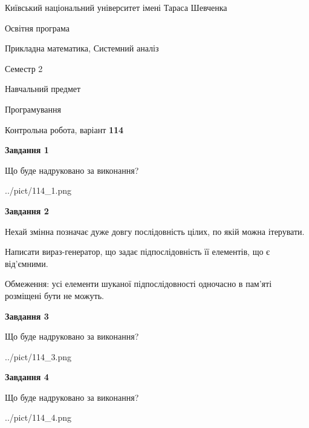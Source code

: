 \documentclass[12pt, ukrainian]{article}
\begin{document}
{{\begin {small}\par
{ \center  Київський національний університет імені Тараса Шевченка \par}
{\parbox {5 cm}{Освітня програма \hfill}{\parbox {8 cm}{Прикладна математика, Системний аналіз \hfill}}\parbox {5 cm}{\hfill Семестр 2}}\par
{\parbox {5 cm} {Навчальний предмет \hfill}\parbox {7 cm}{Програмування \hfill}\parbox {6cm}{\hfill}\par}\vspace{-7pt} \end{small}}{\center Контрольна робота, варіант  \No \textbf
{ 114 }\par}}
{
\begin {large}
{\begin {center}\textbf{Завдання 1}\end {center}}\par
Що буде надруковано за виконання?\par\par
\begin{center}
	{../pict/114_1.png}
\end{center}
\newpage

{\begin {center}\textbf{Завдання 2}\end {center}}\par
Нехай змінна  позначає дуже довгу послідовність цілих, по якій можна ітерувати.

Написати вираз-генератор, що задає підпослідовність її елементів, що є від'єм\-ни\-ми.

Обмеження: усі елементи шуканої підпослідовності одночасно в пам'яті розміщені бути не можуть.\par
\newpage

{\begin {center}\textbf{Завдання 3}\end {center}}\par
Що буде надруковано за виконання?
\begin{center}
	{../pict/114_3.png}
\end{center}
\newpage

{\begin {center}\textbf{Завдання 4}\end {center}}\par
Що буде надруковано за виконання?\par
\begin{center}
	{../pict/114_4.png}
\end{center}
\newpage


\end{large}}
\end{document}
